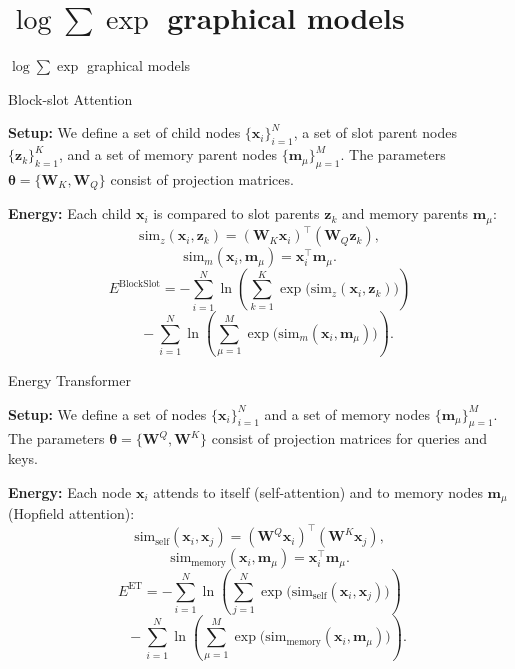 \documentclass{beamer}
\begin{document}

\section{$\log \sum \exp$ graphical models}


\begin{frame}
    \centering
    \Huge $\log \sum \exp$ graphical models
\end{frame}



\begin{frame}{Block-slot Attention}

    \textbf{Setup:}  
    We define a set of child nodes \(\{\bm{x}_i\}_{i=1}^N\), a set of slot parent nodes \(\{\bm{z}_k\}_{k=1}^K\), and a set of memory parent nodes \(\{\bm{m}_\mu\}_{\mu=1}^M\). The parameters \(\bm{\theta} = \{\bm{W}_K, \bm{W}_Q\}\) consist of projection matrices.
    
    \bigskip
    
    \textbf{Energy:}  
    Each child \(\bm{x}_i\) is compared to slot parents \(\bm{z}_k\) and memory parents \(\bm{m}_\mu\):
    \[
    \mathrm{sim}_z(\bm{x}_i, \bm{z}_k) = (\bm{W}_K \bm{x}_i)^\top (\bm{W}_Q \bm{z}_k),
    \]
    \[
    \mathrm{sim}_m(\bm{x}_i, \bm{m}_\mu) = \bm{x}_i^\top \bm{m}_\mu.
    \]
    \[
    E^{\mathrm{BlockSlot}}
    = -\sum_{i=1}^N 
    \ln \left(
    \sum_{k=1}^K \exp\bigl(\mathrm{sim}_z(\bm{x}_i, \bm{z}_k)\bigr)
    \right)  
    \]
    \[
    \quad -\sum_{i=1}^N 
    \ln \left(
    \sum_{\mu=1}^M \exp\bigl(\mathrm{sim}_m(\bm{x}_i, \bm{m}_\mu)\bigr)
    \right).
    \]
    
\end{frame}

\begin{frame}{Energy Transformer}

    \textbf{Setup:}  
    We define a set of nodes \(\{\bm{x}_i\}_{i=1}^N\) and a set of memory nodes \(\{\bm{m}_\mu\}_{\mu=1}^M\). The parameters \(\bm{\theta} = \{\bm{W}^Q, \bm{W}^K\}\) consist of projection matrices for queries and keys.
    
    \bigskip
    
    \textbf{Energy:}  
    Each node \(\bm{x}_i\) attends to itself (self-attention) and to memory nodes \(\bm{m}_\mu\) (Hopfield attention):
    \[
    \mathrm{sim}_{\text{self}}(\bm{x}_i, \bm{x}_j) = (\bm{W}^Q \bm{x}_i)^\top (\bm{W}^K \bm{x}_j),
    \]
    \[
    \mathrm{sim}_{\text{memory}}(\bm{x}_i, \bm{m}_\mu) = \bm{x}_i^\top \bm{m}_\mu.
    \]
    \[
    E^{\mathrm{ET}}
    =
    -\sum_{i=1}^N 
    \ln \left(
    \sum_{j=1}^N \exp\bigl(\mathrm{sim}_{\text{self}}(\bm{x}_i, \bm{x}_j)\bigr)
    \right)  
    \]
    \[
    \quad -\sum_{i=1}^N 
    \ln \left(
    \sum_{\mu=1}^M \exp\bigl(\mathrm{sim}_{\text{memory}}(\bm{x}_i, \bm{m}_\mu)\bigr)
    \right).
    \]
    
\end{frame}
\end{document}
